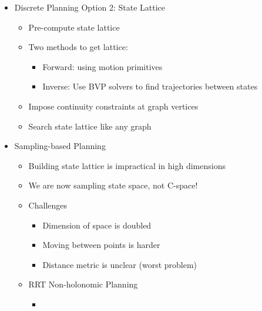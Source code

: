 \documentclass[../main.tex]{subfiles}
\begin{document}
\begin{itemize}
        \item Discrete Planning Option 2: State Lattice
        \begin{itemize}
            \item Pre-compute state lattice
            \item Two methods to get lattice:
            \begin{itemize}
                \item Forward: using motion primitives
                \item Inverse: Use BVP solvers to find trajectories between states
            \end{itemize}
            \item Impose continuity constraints at graph vertices
            \item Search state lattice like any graph
        \end{itemize}
        \item Sampling-based Planning
        \begin{itemize}
            \item Building state lattice is impractical in high dimensions
            \item We are now sampling state space, not C-space!
            \item Challenges
            \begin{itemize}
                \item Dimension of space is doubled
                \item Moving between points is harder
                \item Distance metric is unclear (worst problem)
            \end{itemize}
            \item RRT Non-holonomic Planning
            \begin{itemize}
                \item
            \end{itemize}
        \end{itemize}
    \end{itemize}
\end{document}
